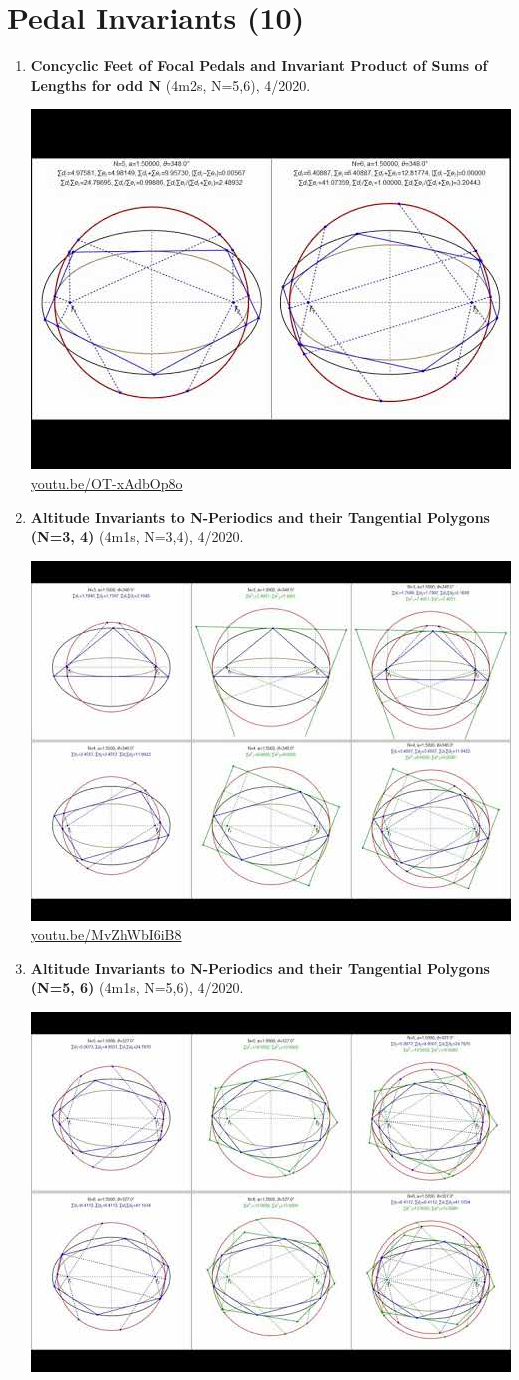 \documentclass[12pt]{amsart}
\begin{document}
\section{Pedal Invariants (10)}

\begin{enumerate}[resume]
\item \textbf{Concyclic Feet of Focal Pedals and Invariant Product of Sums of Lengths for odd N} (4m2s, N=5,6), 4/2020. 
\begin{center}\includegraphics[width=.5\textwidth]{pics/OT-xAdbOp8o.jpg} \\ 
\href{https://youtu.be/OT-xAdbOp8o}{\url{youtu.be/OT-xAdbOp8o}}\end{center}
% 
\item \textbf{Altitude Invariants to N-Periodics and their Tangential Polygons (N=3, 4)} (4m1s, N=3,4), 4/2020. 
\begin{center}\includegraphics[width=.5\textwidth]{pics/MvZhWbI6iB8.jpg} \\ 
\href{https://youtu.be/MvZhWbI6iB8}{\url{youtu.be/MvZhWbI6iB8}}\end{center}
% 
\item \textbf{Altitude Invariants to N-Periodics and their Tangential Polygons (N=5, 6)} (4m1s, N=5,6), 4/2020. 
\begin{center}\includegraphics[width=.5\textwidth]{pics/RNmHROZNGj8.jpg} \\ 

\end{center}
\end{enumerate}
\end{document}
